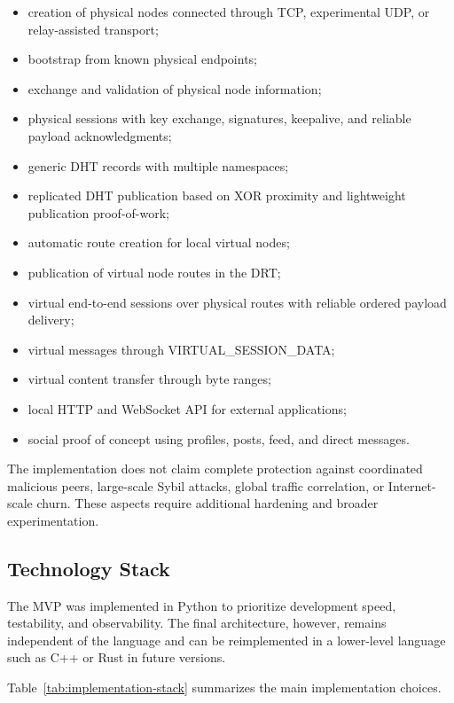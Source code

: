 \documentclass[12pt,a4paper]{article}
\newcommand{\codebreak}[1]{{\footnotesize\ttfamily #1}}
\begin{document}
\begin{itemize}
    \item creation of physical nodes connected through TCP, experimental UDP, or relay-assisted transport;
    \item bootstrap from known physical endpoints;
    \item exchange and validation of physical node information;
    \item physical sessions with key exchange, signatures, keepalive, and reliable payload acknowledgments;
    \item generic DHT records with multiple namespaces;
    \item replicated DHT publication based on XOR proximity and lightweight publication proof-of-work;
    \item automatic route creation for local virtual nodes;
    \item publication of virtual node routes in the DRT;
    \item virtual end-to-end sessions over physical routes with reliable ordered payload delivery;
    \item virtual messages through \codebreak{VIRTUAL\_\allowbreak{}SESSION\_\allowbreak{}DATA};
    \item virtual content transfer through byte ranges;
    \item local HTTP and WebSocket API for external applications;
    \item social proof of concept using profiles, posts, feed, and direct messages.
\end{itemize}

The implementation does not claim complete protection against coordinated malicious peers, large-scale Sybil attacks, global traffic correlation, or Internet-scale churn. These aspects require additional hardening and broader experimentation.

\subsection{Technology Stack}
\label{sec:technology-stack}

The MVP was implemented in Python to prioritize development speed, testability, and observability. The final architecture, however, remains independent of the language and can be reimplemented in a lower-level language such as C++ or Rust in future versions.

Table~\ref{tab:implementation-stack} summarizes the main implementation choices.
\end{document}

